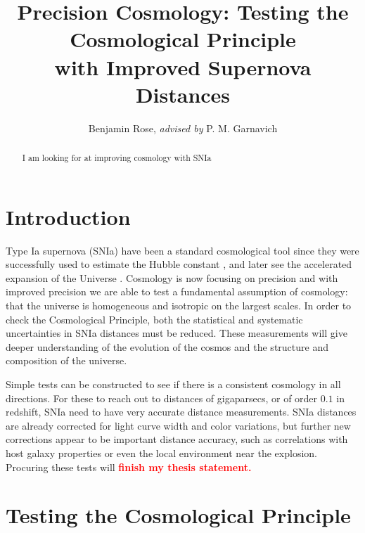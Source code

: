 \documentclass[apj, iop]{emulateapj}
\newcommand{\sn}{SNIa}
\newcommand{\todo}[1]{\textbf{\textcolor{red}{#1}}}
\begin{document}
\title{Precision Cosmology: Testing the Cosmological Principle \\with Improved Supernova Distances}

\author{Benjamin Rose, {\it advised by} P. M. Garnavich}


\begin{abstract}
I am looking for at improving cosmology with \sn{}
\end{abstract}

\maketitle

\section{Introduction}\label{introduction} 

Type Ia supernova (\sn{}) have been a standard cosmological tool since they were
successfully used to estimate the Hubble constant \citep{Hamuy95,Riess95}, and
later see the accelerated expansion of the Universe
\citep{Riess98,Perlmutter99}. Cosmology is now focusing on precision and with
improved precision we are able to test a fundamental assumption of cosmology:
that the universe is homogeneous and isotropic on the largest scales. In order
to check the Cosmological Principle, both the statistical and systematic
uncertainties in \sn{} distances must be reduced. These measurements will give
deeper understanding of the evolution of the cosmos and the structure and
composition of the universe.

Simple tests can be constructed to see if there is a consistent cosmology in all
directions. For these to reach out to distances of gigaparsecs, or of order
$0.1$ in redshift, \sn{} need to have very accurate distance measurements. \sn{}
distances are already corrected for light curve width and color variations, but
further new corrections appear to be important distance accuracy, such as
correlations with host galaxy properties or even the local environment near the
explosion. Procuring these tests will \todo{finish my thesis statement.}

\section{Testing the Cosmological Principle}\label{testing-the-cosmological-principle}
\end{document}
